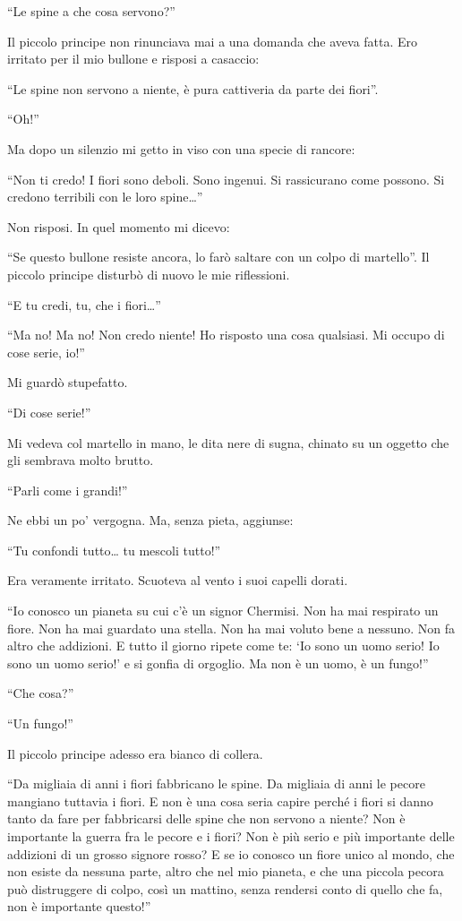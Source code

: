 \documentclass[11pt]{scrbook}
\begin{document}
``Le spine a che cosa servono?''

Il piccolo principe non rinunciava mai a una domanda che aveva fatta. Ero irritato per il mio bullone e risposi a casaccio:

``Le spine non servono a niente, è pura cattiveria da parte dei fiori''.

``Oh!''

Ma dopo un silenzio mi getto in viso con una specie di rancore:

``Non ti credo! I fiori sono deboli. Sono ingenui. Si rassicurano come possono. Si credono terribili con le loro spine\ldots{}''

Non risposi. In quel momento mi dicevo:

``Se questo bullone resiste ancora, lo farò saltare con un colpo di martello''. Il piccolo principe disturbò di nuovo le mie riflessioni.

``E tu credi, tu, che i fiori\ldots{}''

``Ma no! Ma no! Non credo niente! Ho risposto una cosa qualsiasi. Mi occupo di cose serie, io!''

Mi guardò stupefatto.

``Di cose serie!''

Mi vedeva col martello in mano, le dita nere di sugna, chinato su un oggetto che gli sembrava molto brutto.

``Parli come i grandi!''

Ne ebbi un po' vergogna. Ma, senza pieta, aggiunse:

``Tu confondi tutto\ldots{} tu mescoli tutto!''

Era veramente irritato. Scuoteva al vento i suoi capelli dorati.

``Io conosco un pianeta su cui c'è un signor Chermisi. Non ha mai respirato un fiore. Non ha mai guardato una stella. Non ha mai voluto bene a nessuno. Non fa altro che addizioni. E tutto il giorno ripete come te: `Io sono un uomo serio! Io sono un uomo serio!' e si gonfia di orgoglio. Ma non è un uomo, è un fungo!''

``Che cosa?''

``Un fungo!''

Il piccolo principe adesso era bianco di collera.

``Da migliaia di anni i fiori fabbricano le spine. Da migliaia di anni le pecore mangiano tuttavia i fiori. E non è una cosa seria capire perché i fiori si danno tanto da fare per fabbricarsi delle spine che non servono a niente? Non è importante la guerra fra le pecore e i fiori? Non è più serio e più importante delle addizioni di un grosso signore rosso? E se io conosco un fiore unico al mondo, che non esiste da nessuna parte, altro che nel mio pianeta, e che una piccola pecora può distruggere di colpo, così un mattino, senza rendersi conto di quello che fa, non è importante questo!''
\end{document}
